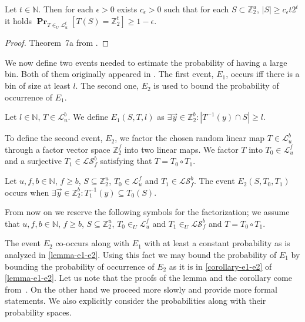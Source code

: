 \documentclass[unicode,review]{siamart1116}
\newcommand{\vecspace}[2]{\mathbb{Z}_{#1}^{#2}}
\newcommand{\binvecspace}[1]{\vecspace{2}{#1}}
\newcommand{\linearmaps}[2]{\mathcal{L}_{#1}^{#2}}
\newcommand{\surjectivelinearmaps}[2]{\mathcal{LS}_{#1}^{#2}}
\newcommand{\probs}[2]{\operatorname{\mathbf{Pr}}_{{#1}}\left[{#2}\right]}
\numberwithin{theorem}{section}
\begin{document}
\begin{theorem}
\label{theorem-epsilon}
Let $t \in \mathbb{N}$.
Then for each $\epsilon > 0$ exists $c_\epsilon > 0$ such that for each $S \subset \binvecspace{u}$, $|S| \geq c_\epsilon t 2^t$ it holds  $\probs{T \in_U \linearmaps{u}{t}}{T(S) = \binvecspace{t}} \geq 1 - \epsilon$.
\end{theorem}
\begin{proof}
Theorem~{7a} from \cite{alonetal}.
\end{proof}

We now define two events needed to estimate the probability of having a large bin. 
Both of them originally appeared in \cite{alonetal}.
The first event, $E_1$, occurs iff there is a bin of size at least $l$.
The second one, $E_2$ is used to bound the probability of occurrence of  $E_1$.
\begin{definition}[Event $E_1$]
Let $l \in \mathbb{N}$, $T \in \linearmaps{u}{b}$. We define $E_1(S, T, l)$ as $\exists \vec{y} \in \binvecspace{b} \colon |T^{-1}(y) \cap S| \geq l$.
\end{definition}

To define the second event, $E_2$, we factor the chosen random linear map $T \in \linearmaps{u}{b}$ through a factor vector space $\binvecspace{f}$ into two linear maps.
We factor $T$ into $T_0 \in \linearmaps{u}{f}$ and a surjective $T_1 \in \surjectivelinearmaps{f}{b}$ satisfying that $T = T_0 \circ T_1$.

\begin{definition}[Event $E_2$]
Let $u, f, b \in \mathbb{N}$, $f \geq b$, $S \subseteq \binvecspace{u}$, $T_0 \in \linearmaps{u}{f}$ and $T_1 \in \surjectivelinearmaps{f}{b}$.
The event $E_2(S, T_0, T_1)$ occurs when $\exists \vec{y} \in \binvecspace{b} \colon T_1^{-1}(y) \subseteq T_0(S)$.
\end{definition}

From now on we reserve the following symbols for the factorization; we assume that $u, f, b \in \mathbb{N}$, $f \geq b$, $S \subseteq \binvecspace{u}$, $T_0 \in_U \linearmaps{u}{f}$ and $T_1 \in_U \surjectivelinearmaps{f}{b}$ and $T = T_0 \circ T_1$.

The event $E_2$ co-occurs along with $E_1$ with at least a constant probability as is analyzed in \cref{lemma-e1-e2}. 
Using this fact we may bound the probability of $E_1$ by bounding the probability of occurrence of $E_2$ as it is in \cref{corollary-e1-e2} of \cref{lemma-e1-e2}.
Let us note that the proofs of the lemma and the corollary come from~\cite{alonetal}.
On the other hand we proceed more slowly and provide more formal statements.
We also explicitly consider the probabilities along with their probability spaces.
\end{document}
